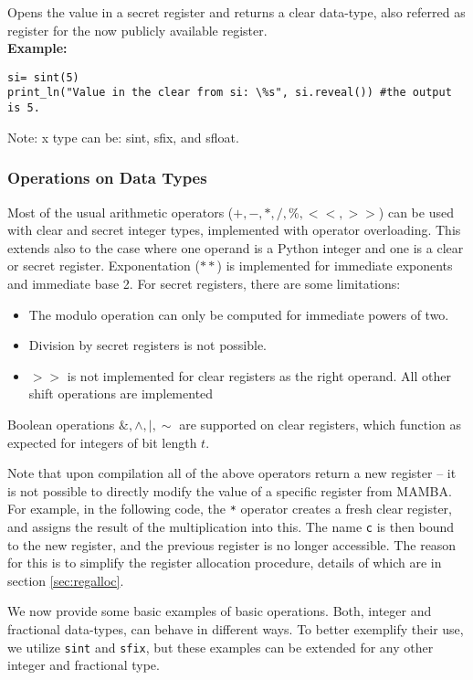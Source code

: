 Opens the value in a secret register and returns a clear data-type, also referred as register for the now publicly available register.\\
\textbf{Example:}
\begin{lstlisting}
si= sint(5)
print_ln("Value in the clear from si: \%s", si.reveal()) #the output is 5.
\end{lstlisting}
\begin{footnotesize}
Note: x type can be: sint, sfix, and sfloat.
\end{footnotesize}


\subsubsection{Operations on Data Types}
Most of the usual arithmetic operators ($+, -, *, /, \%, <<, >>$) can be used with
clear and secret integer types, implemented with operator overloading.
This extends also to the case where one operand is a Python integer and one
is a clear or secret register.
Exponentation ($**$) is implemented for immediate exponents and
immediate base 2.
For secret registers, there are some limitations:
\begin{itemize}
\item The modulo operation can only be computed for immediate powers
  of two.
\item Division by secret registers is not possible.
\item $>>$ is not implemented for clear registers as the right
  operand. All other shift operations are implemented
\end{itemize}
Boolean operations $\&, \wedge, |, \sim$ are supported on clear registers,
which function as expected for integers of bit length $t$.

Note that upon compilation all of the above operators return a 
new register -- it is not possible to directly modify the value 
of a specific register from MAMBA.
For example, in the following code, the \verb|*| operator creates a
fresh clear register, and assigns the result of the multiplication into this.
The name \verb|c| is then bound to the new register, and the previous
register is no longer accessible. The reason for this is to simplify the
register allocation procedure, details of which are in section
\ref{sec:regalloc}.


We now provide some basic examples of basic operations. Both, integer and fractional data-types, can behave in different ways. To better exemplify their use, we utilize \verb|sint| and \verb|sfix|, but these examples can be extended for any other integer and fractional type.

